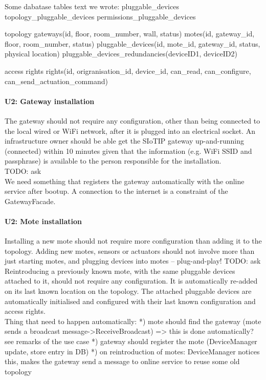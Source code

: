     Some dabatase tables text we wrote:
        pluggable\_devices
        topology\_pluggable\_devices
        permissions\_pluggable\_devices

        topology
            gateways(id, floor, room\_number, wall, status)
            motes(id, gateway\_id, floor, room\_number, status)
            pluggable\_devices(id, mote\_id, gateway\_id, status, physical location)
            pluggable\_devices\_redundancies(deviceID1, deviceID2)

        access rights
            rights(id, origranisation\_id, device\_id, can\_read, can\_configure, can\_send\_actuation\_command)

    \paragraph{U2: Gateway installation}
        The gateway should not require any configuration, other than being connected
        to the local wired or WiFi network, after it is plugged into an electrical
        socket. An infrastructure owner should be able get the SIoTIP gateway
        up-and-running (connected) within 10 minutes given that the information
        (e.g. WiFi SSID and passphrase) is available to the person responsible for
        the installation. \\
        TODO: ask \\
        We need something that registers the gateway automatically with the
        online service after bootup. A connection to the internet is a constraint
        of the GatewayFacade.


    \paragraph{U2: Mote installation}
        Installing a new mote should not require more configuration than adding it
        to the topology. Adding new motes, sensors or actuators should not involve
        more than just starting motes, and plugging devices into motes – plug-and-play! TODO: ask \\
        Reintroducing a previously known mote, with the same pluggable devices attached to it,
        should not require any configuration. It is automatically re-added on
        its last known location on the topology. The attached pluggable devices
        are automatically initialised and configured with their last known
        configuration and access rights. \\
        Thing that need to happen automatically:
        *) mote should find the gateway (mote sends a broadcast message->ReceiveBroadcast) => this is done automatically? see remarks of the use case
        *) gateway should register the mote (DeviceManager update, store entry in DB)
        *) on reintroduction of motes: DeviceManager notices this, makes the gateway send a message to online service to reuse some old topology

